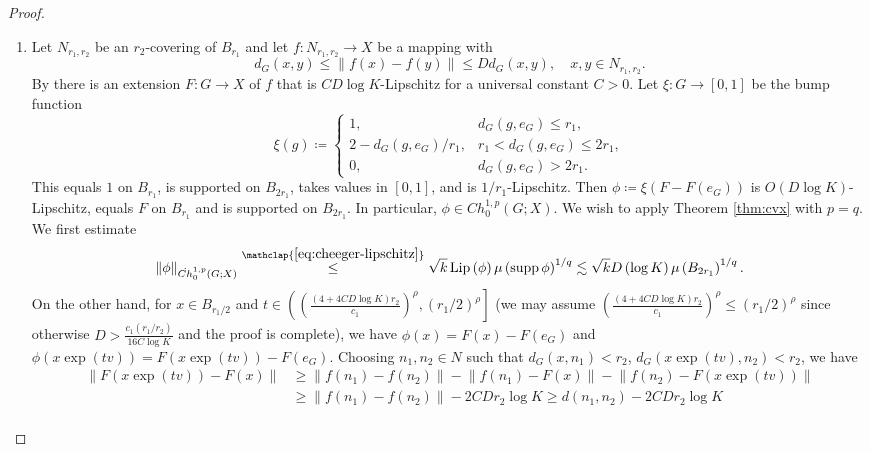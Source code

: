 \documentclass[11pt,reqno]{amsart}
\newcommand{\1}{\mathbf 1}
\begin{document}
\begin{proof}\,

\begin{enumerate}
\item
Let $N_{r_1,r_2}$ be an $r_2$-covering of $B_{r_1}$ and let $f:N_{r_1,r_2}\to X$ be a mapping with
\[
d_G\left(x,y\right)\le \left\|f\left(x\right)-f\left(y\right)\right\|\le D d_G\left(x,y\right),\quad x,y\in N_{r_1,r_2}.
\]
By \cite[Theorem 1.6]{lee2005extending} there is an extension $F:G\to X$ of $f$ that is $CD\log K$-Lipschitz for a universal constant $C>0$. Let $\xi:G\to [0,1]$ be the bump function
\[
\xi\left(g\right)\coloneqq
\begin{cases}
    1,&d_G\left(g,e_G\right)\le r_1,\\
    2-d_G\left(g,e_G\right)/r_1,& r_1<d_G\left(g,e_G\right)\le 2r_1,\\
    0,&d_G\left(g,e_G\right)>2r_1.
\end{cases}
\]
This equals $1$ on $B_{r_1}$, is supported on $B_{2r_1}$, takes values in $\left[0,1\right]$, and is $1/r_1$-Lipschitz. Then $\phi\coloneqq \xi (F-F\left(e_G\right))$ is $O\left(D\log K\right)$-Lipschitz, equals $F$ on $B_{r_1}$ and is supported on $B_{2r_1}$. In particular, $\phi\in Ch_0^{1,p}\left(G;X\right)$. We wish to apply Theorem \ref{thm:cvx} with $p=q$. We first estimate
\[
    \left\|\phi\right\|_{\dot{Ch}_0^{1,p}\left(G;X\right)}\stackrel{\mathclap{\eqref{eq:cheeger-lipschitz}}}{\le} \sqrt{k}\operatorname{Lip}\left(\phi\right)\mu\left(\operatorname{supp}\phi\right)^{1/q}\lesssim \sqrt{k} D\left(\log K\right) \mu\left(B_{2r_1}\right)^{1/q}.
\]
On the other hand, for $x\in B_{r_1/2}$ and $t\in \left(\left(\frac{\left(4+4CD\log K\right)r_2}{c_1}\right)^{\rho},\left(r_1/2\right)^\rho\right]$ (we may assume $\left(\frac{\left(4+4CD\log K\right)r_2}{c_1}\right)^{\rho}\le \left(r_1/2\right)^\rho$ since otherwise $D>\frac{c_1\left(r_1/r_2\right)}{16C\log K}$ and the proof is complete), we have $\phi\left(x\right)=F\left(x\right)-F\left(e_G\right)$ and $\phi\left(x\exp\left(tv\right)\right)=F\left(x\exp\left(tv\right)\right)-F\left(e_G\right)$. Choosing $n_1,n_2\in N$ such that $d_G\left(x,n_1\right)<r_2$, $d_G\left(x\exp\left(tv\right),n_2\right)<r_2$, we have
\begin{align*}
\left\|F\left(x\exp\left(tv\right)\right)-F\left(x\right)\right\|&\ge \left\|f\left(n_1\right)-f\left(n_2\right)\right\|-\left\|f\left(n_1\right)-F\left(x\right)\right\|-\left\|f\left(n_2\right)-F\left(x\exp\left(tv\right)\right)\right\|\\
&\ge\left\|f\left(n_1\right)-f\left(n_2\right)\right\|-2CDr_2\log K\ge d\left(n_1,n_2\right)-2C Dr_2\log K\\

\end{align*}
\end{enumerate}
\end{proof}
\end{document}
